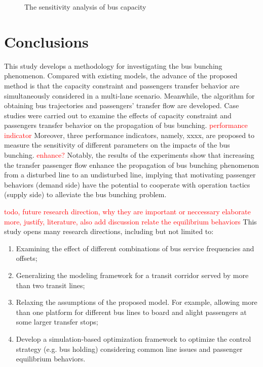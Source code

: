 \documentclass[smallextended]{svjour3}       %
\begin{document}
\begin{Abstract}
\begin{figure}[h]
\begin{tabular}{|c|c|}
      \end{tabular}
      \caption{The sensitivity analysis of bus capacity}
      \label{fig:cap ana}
  \end{figure}

\section{Conclusions}\label{conclusions}
This study develops a methodology for investigating the bus bunching phenomenon.
Compared with existing models, the advance of the proposed method is that the capacity constraint and passengers transfer behavior are simultaneously considered in a multi-lane scenario. 
Meanwhile, the algorithm for obtaining bus trajectories and passengers' transfer flow are developed. 
Case studies were carried out to examine the effects of capacity constraint and passengers transfer behavior on the propagation of bus bunching.
\textcolor{red}{performance indicator}
Moreover, three performance indicators, namely, xxxx, are proposed to measure the sensitivity of different parameters on the impacts of the bus bunching.
\textcolor{red}{enhance?}
Notably, the results of the experiments show that increasing the transfer passenger flow enhance the propagation of bus bunching phenomenon from a disturbed line to an undisturbed line, implying that motivating passenger behaviors (demand side) have the potential to cooperate with operation tactics (supply side) to alleviate the bus bunching problem.

\textcolor{red}{todo, 
future research direction, why they are important or neccessary 
elaborate more, justify, literature, 
also add discussion relate the equilibrium behaviors
}
This study opens many research directions, including but not limited to: 
\begin{enumerate}[1)]
    \item Examining the effect of different combinations of bus service frequencies and offsets; 
    \item Generalizing the modeling framework for a transit corridor served by more than two transit lines; 
    \item Relaxing the assumptions of the proposed model. 
    For example, allowing more than one platform for different bus lines to board and alight passengers at some larger transfer stops; 
    \item Develop a simulation-based optimization framework to optimize the control strategy (e.g. bus holding) considering common line issues and passenger equilibrium behaviors.
\end{enumerate}


\end{Abstract}
\end{document}
